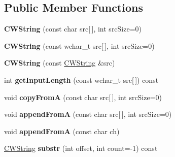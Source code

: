 \subsection*{Public Member Functions}
\begin{DoxyCompactItemize}
\item 
\hypertarget{classps_1_1base_1_1CWString_afa718ed783ec810c4e4ae1c200cecedb}{}{\bfseries C\+W\+String} (const char src\mbox{[}$\,$\mbox{]}, int src\+Size=0)\label{classps_1_1base_1_1CWString_afa718ed783ec810c4e4ae1c200cecedb}

\item 
\hypertarget{classps_1_1base_1_1CWString_adc731938a7f972a5e474ee8ae123afc6}{}{\bfseries C\+W\+String} (const wchar\+\_\+t src\mbox{[}$\,$\mbox{]}, int src\+Size=0)\label{classps_1_1base_1_1CWString_adc731938a7f972a5e474ee8ae123afc6}

\item 
\hypertarget{classps_1_1base_1_1CWString_a83cac3f3f5687b4bc9b3d7b7c2237f50}{}{\bfseries C\+W\+String} (const \hyperlink{classps_1_1base_1_1CWString}{C\+W\+String} \&src)\label{classps_1_1base_1_1CWString_a83cac3f3f5687b4bc9b3d7b7c2237f50}

\item 
\hypertarget{classps_1_1base_1_1CWString_a868835a8bf516e3aa70061733d298fe8}{}int {\bfseries get\+Input\+Length} (const wchar\+\_\+t src\mbox{[}$\,$\mbox{]}) const \label{classps_1_1base_1_1CWString_a868835a8bf516e3aa70061733d298fe8}

\item 
\hypertarget{classps_1_1base_1_1CWString_a70033f3a0d59e3046a1051f4e0f8d8c3}{}void {\bfseries copy\+From\+A} (const char src\mbox{[}$\,$\mbox{]}, int src\+Size=0)\label{classps_1_1base_1_1CWString_a70033f3a0d59e3046a1051f4e0f8d8c3}

\item 
\hypertarget{classps_1_1base_1_1CWString_a023b535126e6e3e599e844084405dfb7}{}void {\bfseries append\+From\+A} (const char src\mbox{[}$\,$\mbox{]}, int src\+Size=0)\label{classps_1_1base_1_1CWString_a023b535126e6e3e599e844084405dfb7}

\item 
\hypertarget{classps_1_1base_1_1CWString_aab4a3437ad012fffc8ff72e0683c2363}{}void {\bfseries append\+From\+A} (const char ch)\label{classps_1_1base_1_1CWString_aab4a3437ad012fffc8ff72e0683c2363}

\item 
\hypertarget{classps_1_1base_1_1CWString_a663becbe8fc2d7633de35d38cf957f2a}{}\hyperlink{classps_1_1base_1_1CWString}{C\+W\+String} {\bfseries substr} (int offset, int count=-\/1) const \label{classps_1_1base_1_1CWString_a663becbe8fc2d7633de35d38cf957f2a}


\end{DoxyCompactItemize}
